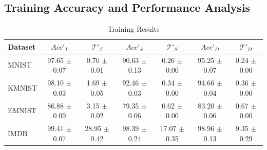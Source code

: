 \documentclass[sn-mathphys-num]{sn-jnl}%
\theoremstyle{thmstyleone}%
\theoremstyle{thmstyletwo}%
\theoremstyle{thmstylethree}%
\begin{document}
\subsection{Training Accuracy and Performance Analysis} \label{sec:trapa}

\begin{table}
\centering
\caption{Training Results}
\begin{tabular}{|l|c|c|c|c|c|c|}
\hline
Dataset & $Acc'_T$ & $\mathcal{T}'_T$ & $Acc'_S$ & $\mathcal{T}'_S$ & $Acc'_D$ & $\mathcal{T}'_D$ \\
\hline
MNIST & 97.65 \newline $\pm$ 0.07 & 0.70 \newline $\pm$ 0.01 & 90.63 \newline $\pm$ 0.13 & 0.26 \newline $\pm$ 0.00 & 95.25 \newline $\pm$ 0.07 & 0.24 \newline $\pm$ 0.00 \\\hline%
KMNIST & 98.10 \newline $\pm$ 0.03 & 1.69 \newline $\pm$ 0.05 & 92.46 \newline $\pm$ 0.03 & 0.34 \newline $\pm$ 0.00 & 94.66 \newline $\pm$ 0.04 & 0.36 \newline $\pm$ 0.00 \\\hline%
EMNIST & 86.88 \newline $\pm$ 0.09 & 3.15 \newline $\pm$ 0.02 & 79.35 \newline $\pm$ 0.06 & 0.62 \newline $\pm$ 0.00 & 83.20 \newline $\pm$ 0.06 & 0.67 \newline $\pm$ 0.00 \\\hline%
IMDB & 99.41 \newline $\pm$ 0.07 & 28.95 \newline $\pm$ 0.42 & 98.39 \newline $\pm$ 0.24 & 17.07 \newline $\pm$ 0.35 & 98.96 \newline $\pm$ 0.13 & 9.35 \newline $\pm$ 0.29 \\
\hline
\end{tabular}
\label{tab:train-table-dkd}
\end{table}
\end{document}
